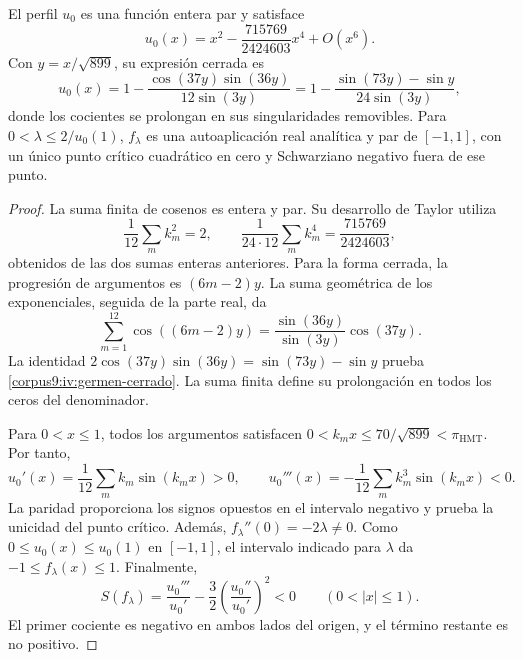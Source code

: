\begin{proposition}
\label{corpus9:iv:germen-analitico}
El perfil \(u_0\) es una función entera par y satisface
\[
 u_0(x)=x^2-\frac{715769}{2424603}x^4+O(x^6).
\]
Con \(y=x/\sqrt{899}\), su expresión cerrada es
\begin{equation}
 u_0(x)
  =1-\frac{\cos(37y)\sin(36y)}{12\sin(3y)}
  =1-\frac{\sin(73y)-\sin y}{24\sin(3y)},
 \label{corpus9:iv:germen-cerrado}
\end{equation}
donde los cocientes se prolongan en sus singularidades removibles.
Para \(0<\lambda\leq2/u_0(1)\), \(f_\lambda\) es una
autoaplicación real analítica y par de \([-1,1]\), con un
único punto crítico cuadrático en cero y Schwarziano negativo
fuera de ese punto.
\end{proposition}
\begin{proof}
La suma finita de cosenos es entera y par. Su desarrollo de
Taylor utiliza
\[
 \frac1{12}\sum_m k_m^2=2,\qquad
 \frac1{24\cdot12}\sum_m k_m^4=\frac{715769}{2424603},
\]
obtenidos de las dos sumas enteras anteriores. Para la forma
cerrada, la progresión de argumentos es \((6m-2)y\). La suma
geométrica de los exponenciales, seguida de la parte real, da
\[
 \sum_{m=1}^{12}\cos((6m-2)y)
   =\frac{\sin(36y)}{\sin(3y)}\cos(37y).
\]
La identidad \(2\cos(37y)\sin(36y)=\sin(73y)-\sin y\)
prueba \eqref{corpus9:iv:germen-cerrado}. La suma finita define
su prolongación en todos los ceros del denominador.

Para \(0<x\leq1\), todos los argumentos satisfacen
\(0<k_mx\leq70/\sqrt{899}<\pi_{\mathrm{HMT}}\). Por tanto,
\[
 u_0'(x)=\frac1{12}\sum_m k_m\sin(k_mx)>0,\qquad
 u_0'''(x)=-\frac1{12}\sum_m k_m^3\sin(k_mx)<0.
\]
La paridad proporciona los signos opuestos en el intervalo
negativo y prueba la unicidad del punto crítico. Además,
\(f_\lambda''(0)=-2\lambda\ne0\). Como
\(0\leq u_0(x)\leq u_0(1)\) en \([-1,1]\), el intervalo
indicado para \(\lambda\) da
\(-1\leq f_\lambda(x)\leq1\). Finalmente,
\[
 S(f_\lambda)
  =\frac{u_0'''}{u_0'}
   -\frac32\left(\frac{u_0''}{u_0'}\right)^2<0
 \qquad(0<|x|\leq1).
\]
El primer cociente es negativo en ambos lados del origen,
y el término restante es no positivo.
\end{proof}

